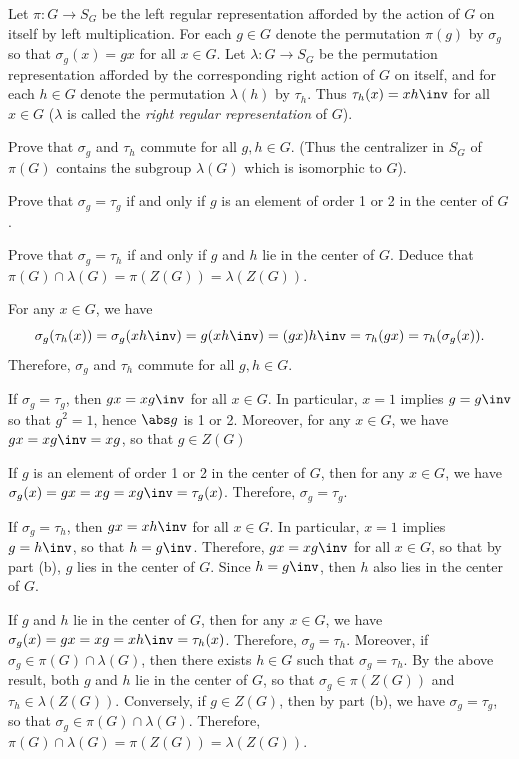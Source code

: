 \begin{specialexercise}
	Let $\pi : G \to S_G$ be the left regular representation afforded by the action of $G$ on itself by left multiplication. For each $g \in G$ denote the permutation $\pi(g)$ by $\sigma_g$ so that $\sigma_g(x) = gx$ for all $x \in G$. Let $\lambda : G \to S_G$ be the permutation representation afforded by the corresponding right action of $G$ on itself, and for each $h \in G$ denote the permutation $\lambda(h)$ by $\tau_h$. Thus $\tau_h(x) = xh\inv$ for all $x \in G$ ($\lambda$ is called the \emph{right regular representation} of $G$).
	\begin{subproblems}
		\item Prove that $\sigma_g$ and $\tau_h$ commute for all $g, h \in G$. (Thus the centralizer in $S_G$ of $\pi(G)$ contains the subgroup $\lambda(G)$ which is isomorphic to $G$).
		\item Prove that $\sigma_g = \tau_g$ if and only if $g$ is an element of order 1 or 2 in the center of $G$.
		\item Prove that $\sigma_g = \tau_h$ if and only if $g$ and $h$ lie in the center of $G$. Deduce that $\pi(G) \cap \lambda(G) = \pi(Z(G)) = \lambda(Z(G))$.
	\end{subproblems}
\end{specialexercise}

\begin{solalph}
	\item For any $x \in G$, we have
	\[\sigma_g(\tau_h(x)) = \sigma_g(xh\inv) = g(xh\inv) = (gx)h\inv = \tau_h(gx) = \tau_h(\sigma_g(x)).\]
	Therefore, $\sigma_g$ and $\tau_h$ commute for all $g, h \in G$.
	\item If $\sigma_g = \tau_g$, then $gx = xg\inv$ for all $x \in G$. In particular, $x = 1$ implies $g = g\inv$ so that $g^2 = 1$, hence $\abs g$ is 1 or 2. Moreover, for any $x \in G$, we have $gx = xg\inv = xg$, so that $g \in Z(G)$
	
	If $g$ is an element of order 1 or 2 in the center of $G$, then for any $x \in G$, we have $\sigma_g(x) = gx = xg = xg\inv = \tau_g(x)$. Therefore, $\sigma_g = \tau_g$.
	\item If $\sigma_g = \tau_h$, then $gx = xh\inv$ for all $x \in G$. In particular, $x = 1$ implies $g = h\inv$, so that $h = g\inv$. Therefore, $gx = xg\inv$ for all $x \in G$, so that by part (b), $g$ lies in the center of $G$. Since $h = g\inv$, then $h$ also lies in the center of $G$.
	
	If $g$ and $h$ lie in the center of $G$, then for any $x \in G$, we have $\sigma_g(x) = gx = xg = xh\inv = \tau_h(x)$. Therefore, $\sigma_g = \tau_h$. Moreover, if $\sigma_g \in \pi(G) \cap \lambda(G)$, then there exists $h \in G$ such that $\sigma_g = \tau_h$. By the above result, both $g$ and $h$ lie in the center of $G$, so that $\sigma_g \in \pi(Z(G))$ and $\tau_h \in \lambda(Z(G))$. Conversely, if $g \in Z(G)$, then by part (b), we have $\sigma_g = \tau_g$, so that $\sigma_g \in \pi(G) \cap \lambda(G)$. Therefore, $\pi(G) \cap \lambda(G) = \pi(Z(G)) = \lambda(Z(G))$.
\end{solalph}

